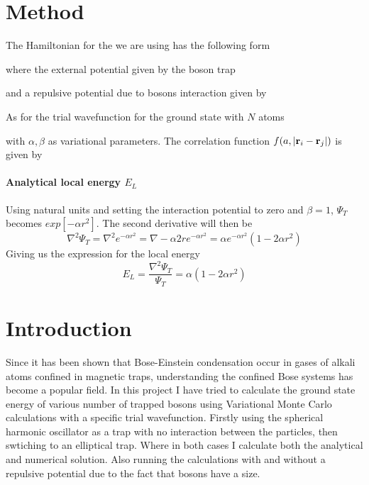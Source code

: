 \documentclass[12pt]{article}
\begin{document}
\section{Method}

  The Hamiltonian for the we are using has the following form


  where the external potential given by the boson trap


  and a repulsive potential due to bosons interaction given by

  As for the trial wavefunction for the ground state with $N$ atoms


  with $\alpha, \beta$ as variational parameters. The correlation function 
  $f(a,|{\bf r}_i-{\bf r}_j|)$ is given by

 
  \paragraph{Analytical local energy $E_L$}
   
  Using natural units and setting the interaction potential to zero and $\beta = 1$,
  $\Psi_T$ becomes $exp[-\alpha r^2]$. The second derivative will then be
  \begin{equation}
    \nabla^2\Psi_T = \nabla^2 e^{-\alpha r^2} = \nabla -\alpha 2r e^{-\alpha r^2}%
    = \alpha e^{-\alpha r^2}(1 - 2\alpha r^2)
  \end{equation}
  Giving us the expression for the local energy
  \begin{equation}
    E_L = \frac{\nabla^2 \Psi_T}{\Psi_T} = \alpha (1 - 2\alpha r^2)
  \end{equation}

  \section{Introduction}
  Since it has been shown that Bose-Einstein condensation occur in gases of alkali 
  atoms confined in magnetic traps, understanding the confined Bose systems has 
  become a popular field. In this project I have tried to calculate the ground 
  state energy of various number of trapped bosons using Variational Monte Carlo 
  calculations with a specific trial wavefunction. Firstly using the spherical 
  harmonic oscillator as a trap with no interaction between the particles, then
  swtiching to an elliptical trap. Where in both cases I calculate both the 
  analytical and numerical solution. Also running the calculations with and 
  without a repulsive potential due to the fact that bosons have a size.
\end{document}
